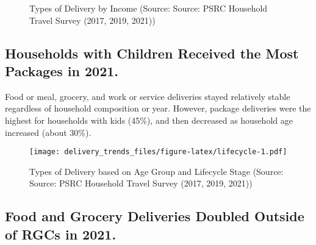 \documentclass[
  11pt,
]{article}
\begin{document}
\begin{figure}[H]
\caption{Types of Delivery by Income (Source: Source: PSRC Household Travel Survey (2017, 2019, 2021))}\label{fig:income blocks}
\end{figure}

\hypertarget{households-with-children-received-the-most-packages-in-2021.}{%
\subsection{Households with Children Received the Most Packages in
2021.}\label{households-with-children-received-the-most-packages-in-2021.}}

\begin{flushleft}
Food or meal, grocery, and work or service deliveries stayed relatively stable regardless of household composition
or year. However, package deliveries were the highest for households with kids (45\%), and then decreased as household age increased (about 30\%).
\end{flushleft}

\begin{figure}
\centering
\texttt{[image: delivery\_trends\_files/figure-latex/lifecycle-1.pdf]}
\caption{Types of Delivery based on Age Group and Lifecycle Stage
(Source: Source: PSRC Household Travel Survey (2017, 2019, 2021))}
\end{figure}

\hypertarget{food-and-grocery-deliveries-doubled-outside-of-rgcs-in-2021.}{%
\subsection{Food and Grocery Deliveries Doubled Outside of RGCs in
2021.}\label{food-and-grocery-deliveries-doubled-outside-of-rgcs-in-2021.}}
\end{document}
